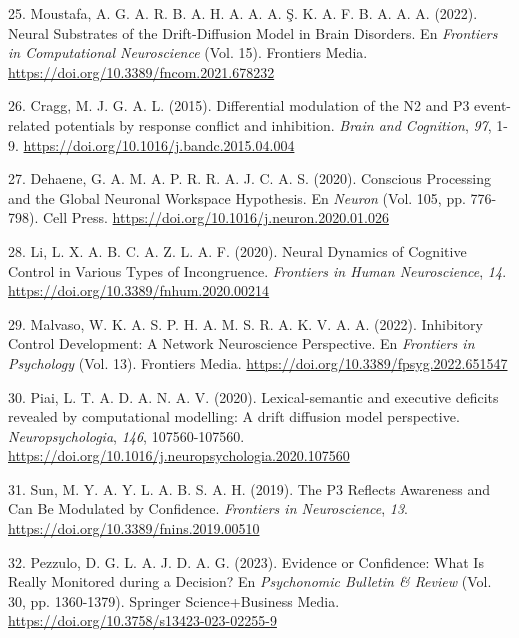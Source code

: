 \documentclass[
  spanish,
  10pt,
]{article}
\newlength{\cslhangindent}
\newenvironment{CSLReferences}[2] %
 {\begin{list}{}{%
  \setlength{\itemindent}{0pt}
  \setlength{\leftmargin}{0pt}
  \setlength{\parsep}{0pt}
  \ifodd #1
   \setlength{\leftmargin}{\cslhangindent}
   \setlength{\itemindent}{-1\cslhangindent}
  \fi
  \setlength{\itemsep}{#2\baselineskip}}}
 {\end{list}}
\begin{document}
\begin{CSLReferences}{1}{0}
25. Moustafa, A. G. A. R. B. A. H. A. A. A. Ş. K. A. F. B. A. A. A.
(2022). Neural Substrates of the Drift-Diffusion Model in Brain
Disorders. En \emph{Frontiers in Computational Neuroscience} (Vol. 15).
Frontiers Media. \url{https://doi.org/10.3389/fncom.2021.678232}

26. Cragg, M. J. G. A. L. (2015). Differential modulation of the N2 and
P3 event-related potentials by response conflict and inhibition.
\emph{Brain and Cognition}, \emph{97}, 1-9.
\url{https://doi.org/10.1016/j.bandc.2015.04.004}

27. Dehaene, G. A. M. A. P. R. R. A. J. C. A. S. (2020). Conscious
Processing and the Global Neuronal Workspace Hypothesis. En
\emph{Neuron} (Vol. 105, pp. 776-798). Cell Press.
\url{https://doi.org/10.1016/j.neuron.2020.01.026}

28. Li, L. X. A. B. C. A. Z. L. A. F. (2020). Neural Dynamics of
Cognitive Control in Various Types of Incongruence. \emph{Frontiers in
Human Neuroscience}, \emph{14}.
\url{https://doi.org/10.3389/fnhum.2020.00214}

29. Malvaso, W. K. A. S. P. H. A. M. S. R. A. K. V. A. A. (2022).
Inhibitory Control Development: A Network Neuroscience Perspective. En
\emph{Frontiers in Psychology} (Vol. 13). Frontiers Media.
\url{https://doi.org/10.3389/fpsyg.2022.651547}

30. Piai, L. T. A. D. A. N. A. V. (2020). Lexical-semantic and executive
deficits revealed by computational modelling: A drift diffusion model
perspective. \emph{Neuropsychologia}, \emph{146}, 107560-107560.
\url{https://doi.org/10.1016/j.neuropsychologia.2020.107560}

31. Sun, M. Y. A. Y. L. A. B. S. A. H. (2019). The P3 Reflects Awareness
and Can Be Modulated by Confidence. \emph{Frontiers in Neuroscience},
\emph{13}. \url{https://doi.org/10.3389/fnins.2019.00510}

32. Pezzulo, D. G. L. A. J. D. A. G. (2023). Evidence or Confidence:
What Is Really Monitored during a Decision? En \emph{Psychonomic
Bulletin \& Review} (Vol. 30, pp. 1360-1379). Springer Science+Business
Media. \url{https://doi.org/10.3758/s13423-023-02255-9}


\end{CSLReferences}
\end{document}
